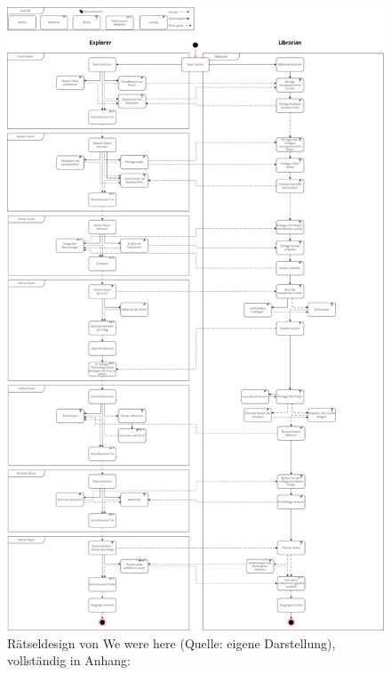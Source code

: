 \begin{figure}[ht]
\centering
\includegraphics[width=0.8\linewidth]{content/pictures/WeWereHereUML.png}
\caption{Rätseldesign von We were here (Quelle: eigene Darstellung), vollständig in Anhang: }
\label{fig:wwh-uml}
\end{figure}

